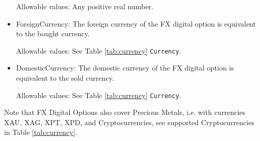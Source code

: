 \begin{itemize}
Allowable values:  Any positive real number.

\item ForeignCurrency: The foreign currency of the FX digital  option is equivalent to the bought currency.  

Allowable values:  See Table \ref{tab:currency} \lstinline!Currency!.

\item DomesticCurrency: The domestic currency of the FX digital  option is equivalent to the sold currency. 

Allowable values:  See Table \ref{tab:currency} \lstinline!Currency!.

\end{itemize}

Note that FX Digital Options also cover Precious Metals, i.e. with
currencies XAU, XAG, XPT, XPD, and Cryptocurrencies,  see supported Cryptocurrencies in Table \ref{tab:currency}.